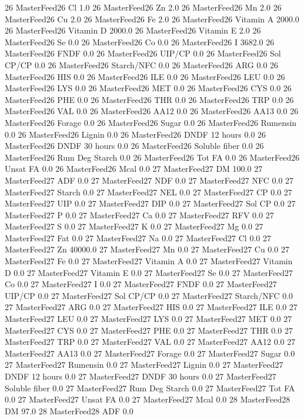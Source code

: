 \documentclass[letterpaper,10pt,english]{sphinxmanual}
\begin{document}
\begin{sphinxVerbatim}[commandchars=\\\{\},numbers=left,firstnumber=1,stepnumber=1]
26 MasterFeed26 Cl 1.0
26 MasterFeed26 Zn 2.0
26 MasterFeed26 Mn 2.0
26 MasterFeed26 Cu 2.0
26 MasterFeed26 Fe 2.0
26 MasterFeed26 Vitamin A 2000.0
26 MasterFeed26 Vitamin D 2000.0
26 MasterFeed26 Vitamin E 2.0
26 MasterFeed26 Se 0.0
26 MasterFeed26 Co 0.0
26 MasterFeed26 I 3682.0
26 MasterFeed26 FNDF 0.0
26 MasterFeed26 UIP/CP 0.0
26 MasterFeed26 Sol CP/CP 0.0
26 MasterFeed26 Starch/NFC 0.0
26 MasterFeed26 ARG 0.0
26 MasterFeed26 HIS 0.0
26 MasterFeed26 ILE 0.0
26 MasterFeed26 LEU 0.0
26 MasterFeed26 LYS 0.0
26 MasterFeed26 MET 0.0
26 MasterFeed26 CYS 0.0
26 MasterFeed26 PHE 0.0
26 MasterFeed26 THR 0.0
26 MasterFeed26 TRP 0.0
26 MasterFeed26 VAL 0.0
26 MasterFeed26 AA\PYGZsh{}12 0.0
26 MasterFeed26 AA\PYGZsh{}13 0.0
26 MasterFeed26 \PYGZpc{} Forage 0.0
26 MasterFeed26 Sugar \PYGZpc{} 0.0
26 MasterFeed26 Rumensin 0.0
26 MasterFeed26 Lignin 0.0
26 MasterFeed26 DNDF 12 hours 0.0
26 MasterFeed26 DNDF 30 hours 0.0
26 MasterFeed26 Soluble fiber 0.0
26 MasterFeed26 Rum Deg Starch 0.0
26 MasterFeed26 Tot FA 0.0
26 MasterFeed26 Unsat FA 0.0
26 MasterFeed26 Mcal 0.0
27 MasterFeed27 DM 100.0
27 MasterFeed27 ADF 0.0
27 MasterFeed27 NDF 0.0
27 MasterFeed27 NFC 0.0
27 MasterFeed27 Starch 0.0
27 MasterFeed27 NEL 0.0
27 MasterFeed27 CP 0.0
27 MasterFeed27 UIP 0.0
27 MasterFeed27 DIP 0.0
27 MasterFeed27 Sol CP 0.0
27 MasterFeed27 P 0.0
27 MasterFeed27 Ca 0.0
27 MasterFeed27 RFV 0.0
27 MasterFeed27 S 0.0
27 MasterFeed27 K 0.0
27 MasterFeed27 Mg 0.0
27 MasterFeed27 Fat 0.0
27 MasterFeed27 Na 0.0
27 MasterFeed27 Cl 0.0
27 MasterFeed27 Zn 40000.0
27 MasterFeed27 Mn 0.0
27 MasterFeed27 Cu 0.0
27 MasterFeed27 Fe 0.0
27 MasterFeed27 Vitamin A 0.0
27 MasterFeed27 Vitamin D 0.0
27 MasterFeed27 Vitamin E 0.0
27 MasterFeed27 Se 0.0
27 MasterFeed27 Co 0.0
27 MasterFeed27 I 0.0
27 MasterFeed27 FNDF 0.0
27 MasterFeed27 UIP/CP 0.0
27 MasterFeed27 Sol CP/CP 0.0
27 MasterFeed27 Starch/NFC 0.0
27 MasterFeed27 ARG 0.0
27 MasterFeed27 HIS 0.0
27 MasterFeed27 ILE 0.0
27 MasterFeed27 LEU 0.0
27 MasterFeed27 LYS 0.0
27 MasterFeed27 MET 0.0
27 MasterFeed27 CYS 0.0
27 MasterFeed27 PHE 0.0
27 MasterFeed27 THR 0.0
27 MasterFeed27 TRP 0.0
27 MasterFeed27 VAL 0.0
27 MasterFeed27 AA\PYGZsh{}12 0.0
27 MasterFeed27 AA\PYGZsh{}13 0.0
27 MasterFeed27 \PYGZpc{} Forage 0.0
27 MasterFeed27 Sugar \PYGZpc{} 0.0
27 MasterFeed27 Rumensin 0.0
27 MasterFeed27 Lignin 0.0
27 MasterFeed27 DNDF 12 hours 0.0
27 MasterFeed27 DNDF 30 hours 0.0
27 MasterFeed27 Soluble fiber 0.0
27 MasterFeed27 Rum Deg Starch 0.0
27 MasterFeed27 Tot FA 0.0
27 MasterFeed27 Unsat FA 0.0
27 MasterFeed27 Mcal 0.0
28 MasterFeed28 DM 97.0
28 MasterFeed28 ADF 0.0

\end{sphinxVerbatim}
\end{document}
